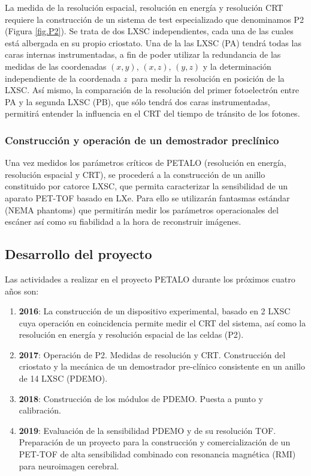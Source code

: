 La medida de la resolución espacial, resolución en energía y resolución CRT requiere la construcción de un sistema de test especializado que denominamos P2 (Figura \ref{fig.P2}). Se trata de dos LXSC independientes, cada una de las cuales está albergada en su propio criostato. Una de la las LXSC (PA) tendrá todas las caras internas instrumentadas, a fin de poder utilizar la redundancia de las medidas de las coordenadas $(x,y)$, $(x,z)$, $(y,z)$ y la determinación independiente de la coordenada $z$~para medir la resolución en posición de la LXSC. Así mismo, la comparación de la resolución del primer fotoelectrón entre PA y la segunda LXSC (PB), que sólo tendrá dos caras instrumentadas, permitirá entender la influencia en el CRT del tiempo de tránsito de los fotones.  

\subsubsection*{Construcción y operación de un demostrador preclínico}
Una vez medidos los parámetros críticos de PETALO (resolución en energía, resolución espacial y CRT), se procederá a la construcción de un anillo constituido por catorce LXSC, que permita caracterizar la sensibilidad de un aparato PET-TOF basado en LXe. Para ello se utilizarán fantasmas estándar (NEMA phantoms) que permitirán medir los parámetros operacionales del escáner así como su fiabilidad a la hora de reconstruir imágenes.

\subsection*{Desarrollo del proyecto}
Las actividades a realizar en el proyecto PETALO durante los próximos cuatro años son:
\begin{enumerate}
\item {\bf 2016}: La construcción de un dispositivo experimental, basado en 2 LXSC cuya operación en coincidencia permite medir el CRT del sistema, así como la resolución en energía y resolución espacial de las celdas (P2).
\item {\bf 2017}: Operación de P2. Medidas de resolución y CRT. Construcción del criostato y la mecánica de un demostrador pre-clínico consistente en un anillo de 14 LXSC (PDEMO). 
\item {\bf 2018}: Construcción de los módulos de PDEMO. Puesta a punto y calibración. 
\item {\bf 2019}: Evaluación de la sensibilidad PDEMO y de su resolución TOF. Preparación de un proyecto para la construcción y comercialización de un PET-TOF de alta sensibilidad combinado con resonancia magnética (RMI) para neuroimagen cerebral.   
\end{enumerate}


